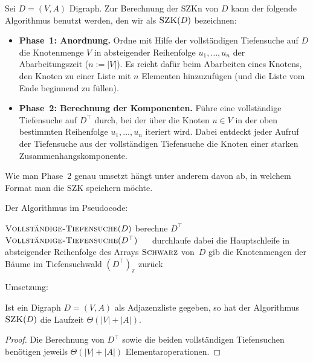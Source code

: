 \begin{bem}  \label{szk:algo}
	Sei $D = (V,A)$ Digraph. Zur Berechnung der SZKn von $D$ kann der folgende Algorithmus benutzt werden, den wir als $\cc{SZK}(D)$ bezeichnen: 
\begin{itemize}
	\item \textbf{Phase~1: Anordnung.} Ordne mit Hilfe der vollständigen Tiefensuche auf $D$ die Knotenmenge $V$ in absteigender Reihenfolge $u_1,\ldots,u_n$ der Abarbeitungszeit ($n:=|V|$). Es reicht dafür beim Abarbeiten eines Knotens, den Knoten zu einer Liste mit $n$ Elementen hinzuzufügen (und die Liste vom Ende beginnend zu füllen). 
	\item \textbf{Phase~2: Berechnung der Komponenten.} Führe eine vollständige Tiefensuche auf $D^\top$ durch, bei der über die Knoten $u \in V$ in der oben bestimmten Reihenfolge $u_1,\ldots,u_n$ iteriert wird. Dabei entdeckt jeder Aufruf der Tiefensuche aus der vollständigen Tiefensuche die Knoten einer starken Zusammenhangskomponente.
\end{itemize} 

\noindent Wie man Phase~2 genau umsetzt hängt unter anderem davon ab, in welchem Format man die SZK speichern möchte. 
\end{bem} 

\begin{bem}
Der Algorithmus im Pseudocode:
\begin{algorithm}[H]
\caption{$\cc{SZK}(D)$}
 \begin{algorithmic}[1]
  \STATE\label{line:szhk0} $\mathop{\text{\textsc{Vollständige-Tiefensuche}}}(D)$
  \STATE berechne $D^\top$
  \STATE\label{line:szhk1} $\mathop{\text{\textsc{Vollständige-Tiefensuche}}}(D^\top)$
  \STATE\label{line:szhk2} $\quad$ durchlaufe dabei die Hauptschleife in absteigender Reihenfolge des Arrays $\mathop{\text{\textsc{Schwarz}}}$ von~$D$
  \STATE gib die Knotenmengen der Bäume im Tiefensuchwald $(D^\top)_\pi$ zurück
 \end{algorithmic}
\end{algorithm}
\end{bem}

\begin{bem} Umsetzung: 

\end{bem} 

\begin{thm}
	\label{thm:starke-zshgk-laufzeit}
	Ist ein Digraph $D=(V,A)$ als Adjazenzliste gegeben, so hat der Algorithmus $\cc{SZK}(D)$ die Laufzeit $\Theta(|V|+|A|)$.
\end{thm}
\begin{proof}
	Die Berechnung von $D^\top$ sowie die beiden vollständigen Tiefensuchen benötigen jeweils  $\Theta(|V|+|A|)$ Elementaroperationen. 
\end{proof}


